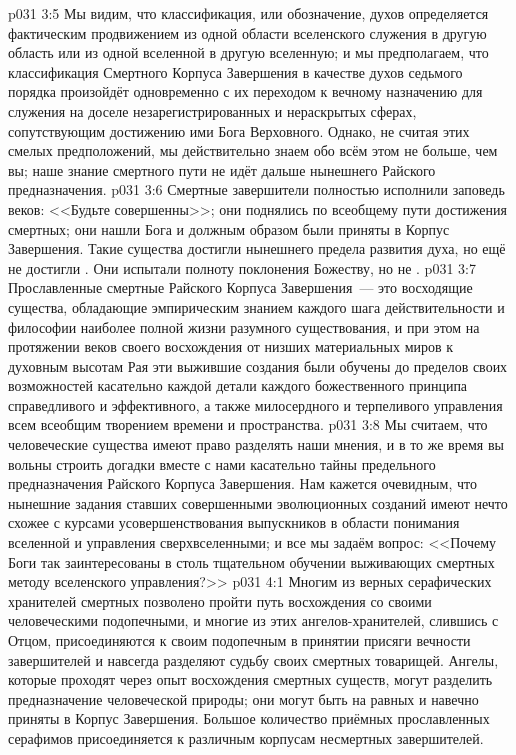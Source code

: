 \vs p031 3:5 Мы видим, что классификация, или обозначение, духов определяется фактическим продвижением из одной области вселенского служения в другую область или из одной вселенной в другую вселенную; и мы предполагаем, что классификация Смертного Корпуса Завершения в качестве духов седьмого порядка произойдёт одновременно с их переходом к вечному назначению для служения на доселе незарегистрированных и нераскрытых сферах, сопутствующим достижению ими Бога Верховного. Однако, не считая этих смелых предположений, мы действительно знаем обо всём этом не больше, чем вы; наше знание смертного пути не идёт дальше нынешнего Райского предназначения.
\vs p031 3:6 Смертные завершители полностью исполнили заповедь веков: <<Будьте совершенны>>; они поднялись по всеобщему пути достижения смертных; они нашли Бога и должным образом были приняты в Корпус Завершения. Такие существа достигли нынешнего предела развития духа, но ещё не достигли . Они испытали полноту поклонения Божеству, но не .
\vs p031 3:7 Прославленные смертные Райского Корпуса Завершения~--- это восходящие существа, обладающие эмпирическим знанием каждого шага действительности и философии наиболее полной жизни разумного существования, и при этом на протяжении веков своего восхождения от низших материальных миров к духовным высотам Рая эти выжившие создания были обучены до пределов своих возможностей касательно каждой детали каждого божественного принципа справедливого и эффективного, а также милосердного и терпеливого управления всем всеобщим творением времени и пространства.
\vs p031 3:8 \pc Мы считаем, что человеческие существа имеют право разделять наши мнения, и в то же время вы вольны строить догадки вместе с нами касательно тайны предельного предназначения Райского Корпуса Завершения. Нам кажется очевидным, что нынешние задания ставших совершенными эволюционных созданий имеют нечто схожее с курсами усовершенствования выпускников в области понимания вселенной и управления сверхвселенными; и все мы задаём вопрос: <<Почему Боги так заинтересованы в столь тщательном обучении выживающих смертных методу вселенского управления?>>
\vs p031 4:1 Многим из верных серафических хранителей смертных позволено пройти путь восхождения со своими человеческими подопечными, и многие из этих ангелов\hyp{}хранителей, слившись с Отцом, присоединяются к своим подопечным в принятии присяги вечности завершителей и навсегда разделяют судьбу своих смертных товарищей. Ангелы, которые проходят через опыт восхождения смертных существ, могут разделить предназначение человеческой природы; они могут быть на равных и навечно приняты в Корпус Завершения. Большое количество приёмных прославленных серафимов присоединяется к различным корпусам несмертных завершителей.
